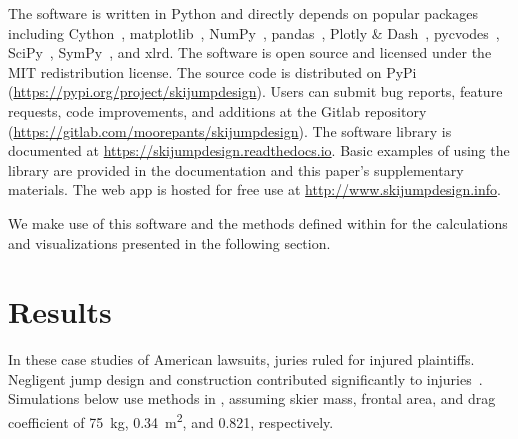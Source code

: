 \documentclass[smallextended]{svjour3}       %
\begin{document}
The software is written in Python and directly depends on popular packages
including Cython~\cite{Behnel2011}, matplotlib~\cite{Hunter2007},
NumPy~\cite{Oliphant2006}, pandas~\cite{McKinney2020}, Plotly \&
Dash~\cite{Plotly2015}, pycvodes~\cite{Dahlgren2018},
SciPy~\cite{Virtanen2020}, SymPy~\cite{Meurer2017}, and xlrd. The software is
open source and licensed under the MIT redistribution license. The source code
is distributed on PyPi (\url{https://pypi.org/project/skijumpdesign}). Users can
submit bug reports, feature requests, code improvements, and additions at the
Gitlab repository (\url{https://gitlab.com/moorepants/skijumpdesign}). The
software library is documented at \url{https://skijumpdesign.readthedocs.io}.
Basic examples of using the library are provided in the documentation and this
paper's supplementary materials. The web app is hosted for free use at
\url{http://www.skijumpdesign.info}.

We make use of this software and the methods defined within for the
calculations and visualizations presented in the following section.

\section{Results}
\label{sec:case}
%
In these case studies of American lawsuits, juries ruled for injured
plaintiffs. Negligent jump design and construction contributed significantly to
injuries~\cite{SuperiorCourtSanFranciscoCounty2002,KingCountySuperiorCourt2008}.
Simulations below use methods in \cite{Levy2015}, assuming skier mass, frontal
area, and drag coefficient of 75~\si{\kg}, 0.34~\si{\meter\squared}, and 0.821,
respectively.
\end{document}
